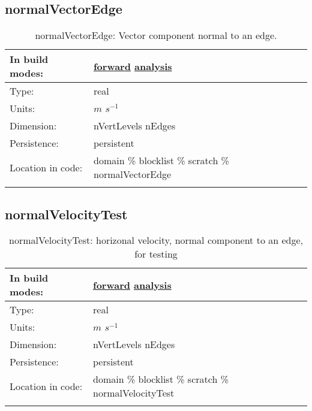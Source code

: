 \subsection[normalVectorEdge]{normalVectorEdge}
\label{subsec:var_sec_scratch_normalVectorEdge}
\begin{center}
\begin{longtable}{| p{2.0in} | p{4.0in} |}
        \hline 
        In build modes: & \hyperref[subsec:forward_var_tab_scratch]{forward} \hyperref[subsec:analysis_var_tab_scratch]{analysis} \\
        \hline 
        Type: & real \\
        \hline 
        Units: & $m$ $s^{-1}$ \\
        \hline 
        Dimension: & nVertLevels nEdges \\
        \hline 
        Persistence: & persistent \\
        \hline 
		 Location in code: & domain \% blocklist \% scratch \% normalVectorEdge \\
		 \hline 
    \caption{normalVectorEdge: Vector component normal to an edge.}
\end{longtable}
\end{center}
\subsection[normalVelocityTest]{normalVelocityTest}
\label{subsec:var_sec_scratch_normalVelocityTest}
\begin{center}
\begin{longtable}{| p{2.0in} | p{4.0in} |}
        \hline 
        In build modes: & \hyperref[subsec:forward_var_tab_scratch]{forward} \hyperref[subsec:analysis_var_tab_scratch]{analysis} \\
        \hline 
        Type: & real \\
        \hline 
        Units: & $m$ $s^{-1}$ \\
        \hline 
        Dimension: & nVertLevels nEdges \\
        \hline 
        Persistence: & persistent \\
        \hline 
		 Location in code: & domain \% blocklist \% scratch \% normalVelocityTest \\
		 \hline 
    \caption{normalVelocityTest: horizonal velocity, normal component to an edge, for testing}
\end{longtable}
\end{center}
